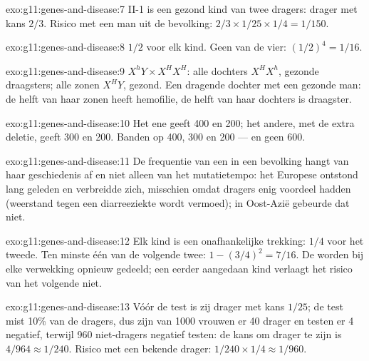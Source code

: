 \begin{solution}{exo:g11:genes-and-disease:7}
II-1 is een gezond kind van twee dragers: drager met kans $2/3$. Risico
met een man uit de bevolking: $2/3 \times 1/25 \times 1/4
= 1/150$.
\end{solution}

\begin{solution}{exo:g11:genes-and-disease:8}
$1/2$ voor elk kind. Geen van de vier: $(1/2)^4 = 1/16$.
\end{solution}

\begin{solution}{exo:g11:genes-and-disease:9}
$X^hY \times X^HX^H$: alle dochters $X^HX^h$, gezonde draagsters; alle
zonen $X^HY$, gezond. Een dragende dochter met een gezonde man: de helft
van haar zonen heeft hemofilie, de helft van haar dochters is draagster.
\end{solution}

\begin{solution}{exo:g11:genes-and-disease:10}
Het ene  geeft 400 en 200; het andere, met de extra deletie, geeft
300 en 200. Banden op 400, 300 en 200 --- en geen 600.
\end{solution}

\begin{solution}{exo:g11:genes-and-disease:11}
De frequentie van een  in een bevolking hangt van haar geschiedenis
af en niet alleen van het mutatietempo: het Europese  ontstond lang
geleden en verbreidde zich, misschien omdat dragers enig voordeel hadden
(weerstand tegen een diarreeziekte wordt vermoed); in Oost-Azië gebeurde
dat niet.
\end{solution}

\begin{solution}{exo:g11:genes-and-disease:12}
Elk kind is een onafhankelijke trekking: $1/4$ voor het tweede. Ten minste
één van de volgende twee: $1 - (3/4)^2 = 7/16$. De  worden bij elke
verwekking opnieuw gedeeld; een eerder aangedaan kind verlaagt het risico
van het volgende niet.
\end{solution}

\begin{solution}{exo:g11:genes-and-disease:13}
Vóór de test is zij drager met kans $1/25$; de test mist 10\% van de
dragers, dus zijn van 1000 vrouwen er 40 drager en testen er 4 negatief,
terwijl 960 niet-dragers negatief testen: de kans om drager te zijn is
$4/964 \approx 1/240$. Risico met een bekende drager: $1/240 \times 1/4
\approx 1/960$.
\end{solution}

